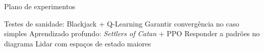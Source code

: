 \documentclass[aspectratio=169]{beamer}
\begin{document}
\begin{frame}{Plano de experimentos}
    \begin{outline}
	\1 Testes de sanidade: Blackjack + Q-Learning
	    \2 Garantir convergência no caso simples
	\vspace{0.25cm}
	\1 Aprendizado profundo: \textit{Settlers of Catan} + PPO
	    \2 Responder a padrões no diagrama %
	    \2 Lidar com espaços de estado maiores %
    \end{outline}
\end{frame}

\begin{frame}[shrink=5]
    \vspace{0.75cm}
    \printbibliography
\end{frame}
\end{document}
